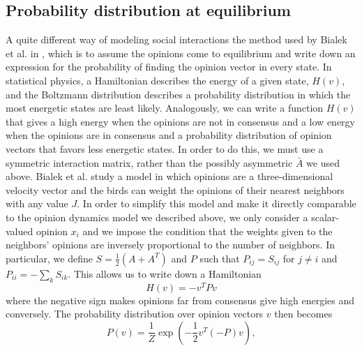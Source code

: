 \documentclass{article}
\begin{document}
\subsection{Probability distribution at equilibrium }
A quite different way of modeling social interactions the method used by Bialek et al. in \cite{Bialek:2012fk}, which is to assume the opinions come to equilibrium and write down an expression for the probability of finding the opinion vector in every state. In statistical physics, a Hamiltonian describes the energy of a given state, $H(v)$, and the Boltzmann distribution describes a probability distribution in which the most energetic states are least likely. Analogously, we can write a function $H(v)$ that gives a high energy when the opinions are not in consensus and a low energy when the opinions are in consensus and a probability distribution of opinion vectors that favors less energetic states. In order to do this, we must use a symmetric interaction matrix, rather than the possibly asymmetric $\bar{A}$ we used above. Bialek et al. study a model in which opinions are a three-dimensional velocity vector and the birds can weight the opinions of their nearest neighbors with any value $J$. In order to simplify this model and make it directly comparable to the opinion dynamics model we described above, we only consider a scalar-valued opinion $x_i$ and we impose the condition that the weights given to the neighbors' opinions are inversely proportional to the number of neighbors. In particular, we define $S=\frac{1}{2}(A+A^T)$ and $P$ such that $P_{ij}=S_{ij}$ for $j\neq i$ and $P_{ii}=-\sum_kS_{ik}$. This allows us to write down a Hamiltonian
\begin{equation}
H(v)=-v^TPv
\end{equation}
where the negative sign makes opinions far from consensus give high energies and conversely. The probability distribution over opinion vectors $v$ then becomes 
\begin{equation}
P(v)=\frac{1}{Z}\exp\left(-\frac{1}{2}v^T(-P)v\right),
\end{equation}
\end{document}
